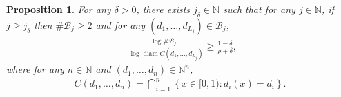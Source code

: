 \documentclass[12pt,reqno]{amsart}
\theoremstyle{definition}
\theoremstyle{plain}
\newtheorem{prop}{Proposition}
\begin{document}
\begin{prop}\label{prop: thm 1 prop 2}
    For any $\delta>0$, there exists $j_{\delta}\in\mathbb{N}$ such that for any $j\in\mathbb{N}$, if $j\geq j_\delta$ then $\#\mathcal{B}_j\geq2$ and for any $(d_1,\ldots,d_{L_j})\in\mathcal{B}_j$,
    \begin{align}
    \label{eq:ratio_est}
        \frac{\log\#\mathcal{B}_j}{-\log \operatorname{diam}{C(d_1,\ldots,d_{L_j})}}
        \geq
        \frac{1-\delta}{\rho+\delta},
    \end{align}
    where for any $n\in\mathbb{N}$ and $(d_1,\ldots,d_{n})\in\mathbb{N}^n$,
    \begin{align*}
        C(d_1,\ldots,d_{n})
        =\bigcap_{i=1}^{n}\left\{x\in[0,1):d_i(x)=d_i\right\}.
    \end{align*}
\end{prop}
\end{document}
